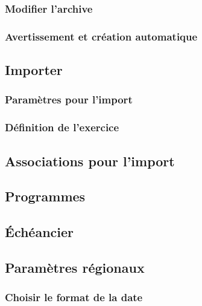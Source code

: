 \subsubsection{Modifier l'archive\label{setup-general-archives-remove}}


\subsubsection{Avertissement et création automatique\label{setup-general-archives-create}}

\subsection{Importer\label{setup-general-import}}

\subsubsection{Paramètres pour l'import\label{setup-general-import-parameters}}


\subsubsection{Définition de l'exercice\label{setup-general-import-financialyear}}

\subsection{Associations pour l'import\label{setup-general-importLinks}}


\subsection{Programmes\label{setup-general-programs}}



\subsection{Échéancier\label{setup-general-planned}}


\subsection{Paramètres régionaux\label{setup-general-localisation}}


\subsubsection{Choisir le format de la date}


